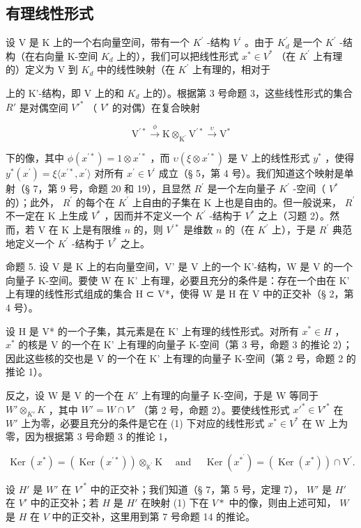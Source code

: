 \subsection{有理线性形式}

设 V 是 K 上的一个右向量空间，带有一个 \(K^{\prime}\) -结构 \(V^{\prime}\) 。由于 \(K_{d}^{\prime}\) 是一个 \(K^{\prime}\) -结构（在右向量 K-空间 \(K_{d}\) 上的），我们可以把线性形式 \(x^{*} \in V^{*}\) （在 \(K^{\prime}\) 上有理的）定义为 V 到 \(K_{d}\) 中的线性映射（在 \(K^{\prime}\) 上有理的，相对于

上的 K'-结构，即 V 上的和 \(K_{d}\) 上的）。根据第 3 号命题 3，这些线性形式的集合 \(R'\) 是对偶空间 \(V'^*\) （ \(V'\) 的对偶）在复合映射

\[
\mathrm{V} ^ {\prime *} \xrightarrow {\phi} \mathrm{K} \otimes_ {\mathrm{K} ^ {\prime}} \mathrm{V} ^ {\prime *} \xrightarrow {\upsilon} \mathrm{V} ^ {*}\tag{1}
\]

下的像，其中 \(\phi(x^{\prime*}) = 1 \otimes x^{\prime*}\) ，而 \(\upsilon(\xi \otimes x^{\prime*})\) 是 V 上的线性形式 \(y^{*}\) ，使得 \(y^{*}(x^{\prime}) = \xi\langle x^{\prime*}, x^{\prime} \rangle\) 对所有 \(x^{\prime} \in V^{\prime}\) 成立（§ 5，第 4 号）。我们知道这个映射是单射（§ 7，第 9 号，命题 20 和 19），且显然 \(R^{\prime}\) 是一个左向量子 \(K^{\prime}\) -空间（ \(V^{*}\) 的）；此外， \(R^{\prime}\) 的每个在 \(K^{\prime}\) 上自由的子集在 K 上也是自由的。但一般说来， \(R^{\prime}\) 不一定在 K 上生成 \(V^{*}\) ，因而并不定义一个 \(K^{\prime}\) -结构于 \(V^{*}\) 之上（习题 2）。然而，若 V 在 K 上是有限维 \(n\) 的，则 \(V^{\prime*}\) 是维数 \(n\) 的（在 \(K^{\prime}\) 上），于是 \(R^{\prime}\) 典范地定义一个 \(K^{\prime}\) -结构于 \(V^{*}\) 之上。

命题 5. 设 V 是 K 上的右向量空间，V' 是 V 上的一个 K'-结构，W 是 V 的一个向量子 K-空间。要使 W 在 K' 上有理，必要且充分的条件是：存在一个由在 K' 上有理的线性形式组成的集合 H ⊂ V*，使得 W 是 H 在 V 中的正交补（§ 2，第 4 号）。

设 H 是 V* 的一个子集，其元素是在 K' 上有理的线性形式。对所有 \(x^{*} \in H\) ， \(x^{*}\) 的核是 V 的一个在 K' 上有理的向量子 K-空间（第 3 号，命题 3 的推论 2）；因此这些核的交也是 V 的一个在 K' 上有理的向量子 K-空间（第 2 号，命题 2 的推论 1）。

反之，设 W 是 V 的一个在 \(K'\) 上有理的向量子 K-空间，于是 W 等同于 \(W' \otimes_{K'} K\) ，其中 \(W' = W \cap V'\) （第 2 号，命题 2）。要使线性形式 \(x'^* \in V'^*\) 在 \(W'\) 上为零，必要且充分的条件是它在 (1) 下对应的线性形式 \(x^* \in V^*\) 在 W 上为零，因为根据第 3 号命题 3 的推论 1，

\[
\operatorname{Ker} (x ^ {*}) = \left(\operatorname{Ker} (x ^ {\prime *})\right) \otimes_ {\mathbb {K} ^ {\prime}} \mathrm{K} \quad \text { and } \quad \operatorname{Ker} (x ^ {* ^ {\prime}}) = (\operatorname{Ker} (x ^ {*})) \cap \mathrm{V} ^ {\prime}.
\]

设 \(H'\) 是 \(W'\) 在 \(V'^*\) 中的正交补；我们知道（§ 7，第 5 号，定理 7）， \(W'\) 是 \(H'\) 在 \(V'\) 中的正交补；若 \(H\) 是 \(H'\) 在映射 (1) 下在 \(V*\) 中的像，则由上述可知， \(W\) 是 \(H\) 在 \(V\) 中的正交补，这里用到第 7 号命题 14 的推论。

